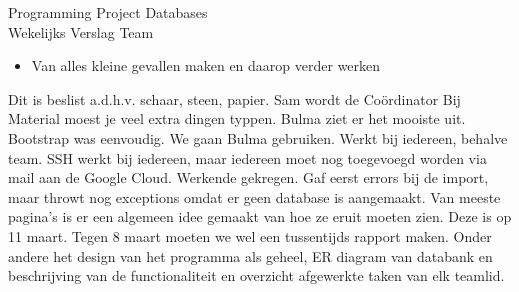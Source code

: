 \documentclass{article}
\newcounter{team}
\begin{document}
	
	\begin{Minutes}{Programming Project Databases \\ Wekelijks Verslag Team }
		\missingNoExcuse{/}
		\missingExcused{/}
		\endtime{}
		
		\maketitle
		
		\begin{itemize}
			\item Van alles kleine gevallen maken en daarop verder werken
		\end{itemize}
		
		

			

			
					Dit is beslist a.d.h.v. schaar, steen, papier.
					Sam wordt de Co\"ordinator
						    Bij Material moest je veel extra dingen typpen. Bulma ziet er het mooiste uit. Bootstrap was eenvoudig. We gaan Bulma gebruiken.
				    Werkt bij iedereen, behalve team.
			        SSH werkt bij iedereen, maar iedereen moet nog toegevoegd worden via mail aan de Google Cloud.
				    Werkende gekregen. Gaf eerst errors bij de import, maar throwt nog exceptions omdat er geen database is aangemaakt.
				    Van meeste pagina's is er een algemeen idee gemaakt van hoe ze eruit moeten zien.
				    Deze is op 11 maart. Tegen 8 maart moeten we wel een tussentijds rapport maken. Onder andere het design van het programma als geheel, ER diagram van databank en beschrijving van de functionaliteit en overzicht afgewerkte taken van elk teamlid.
				

\end{Minutes}
\end{document}
